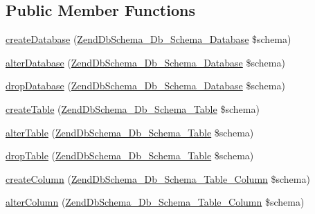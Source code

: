 \subsection*{\-Public \-Member \-Functions}
\begin{DoxyCompactItemize}
\item 
\hyperlink{interfaceZendDbSchema__Db__Schema__Generator__Interface_af72045bae90ffae7b4438b1af3fe5e49}{create\-Database} (\hyperlink{classZendDbSchema__Db__Schema__Database}{\-Zend\-Db\-Schema\-\_\-\-Db\-\_\-\-Schema\-\_\-\-Database} \$schema)
\item 
\hyperlink{interfaceZendDbSchema__Db__Schema__Generator__Interface_ac0b95c05ea295df029cba00b54f2ae00}{alter\-Database} (\hyperlink{classZendDbSchema__Db__Schema__Database}{\-Zend\-Db\-Schema\-\_\-\-Db\-\_\-\-Schema\-\_\-\-Database} \$schema)
\item 
\hyperlink{interfaceZendDbSchema__Db__Schema__Generator__Interface_ae53dad304bbff3552b3df246753a5927}{drop\-Database} (\hyperlink{classZendDbSchema__Db__Schema__Database}{\-Zend\-Db\-Schema\-\_\-\-Db\-\_\-\-Schema\-\_\-\-Database} \$schema)
\item 
\hyperlink{interfaceZendDbSchema__Db__Schema__Generator__Interface_ac8e6b51b79e1264eb65249abe51165e6}{create\-Table} (\hyperlink{classZendDbSchema__Db__Schema__Table}{\-Zend\-Db\-Schema\-\_\-\-Db\-\_\-\-Schema\-\_\-\-Table} \$schema)
\item 
\hyperlink{interfaceZendDbSchema__Db__Schema__Generator__Interface_a285f36341abc7ed75b90e0acafefcfe4}{alter\-Table} (\hyperlink{classZendDbSchema__Db__Schema__Table}{\-Zend\-Db\-Schema\-\_\-\-Db\-\_\-\-Schema\-\_\-\-Table} \$schema)
\item 
\hyperlink{interfaceZendDbSchema__Db__Schema__Generator__Interface_a12376af2b8f922a367dd045abbef67a5}{drop\-Table} (\hyperlink{classZendDbSchema__Db__Schema__Table}{\-Zend\-Db\-Schema\-\_\-\-Db\-\_\-\-Schema\-\_\-\-Table} \$schema)
\item 
\hyperlink{interfaceZendDbSchema__Db__Schema__Generator__Interface_aacb779e067c0d01cec499a259d0fa0fb}{create\-Column} (\hyperlink{classZendDbSchema__Db__Schema__Table__Column}{\-Zend\-Db\-Schema\-\_\-\-Db\-\_\-\-Schema\-\_\-\-Table\-\_\-\-Column} \$schema)
\item 
\hyperlink{interfaceZendDbSchema__Db__Schema__Generator__Interface_a40e5a97560963115061efaa7078ef3f9}{alter\-Column} (\hyperlink{classZendDbSchema__Db__Schema__Table__Column}{\-Zend\-Db\-Schema\-\_\-\-Db\-\_\-\-Schema\-\_\-\-Table\-\_\-\-Column} \$schema)
\item 

\end{DoxyCompactItemize}
